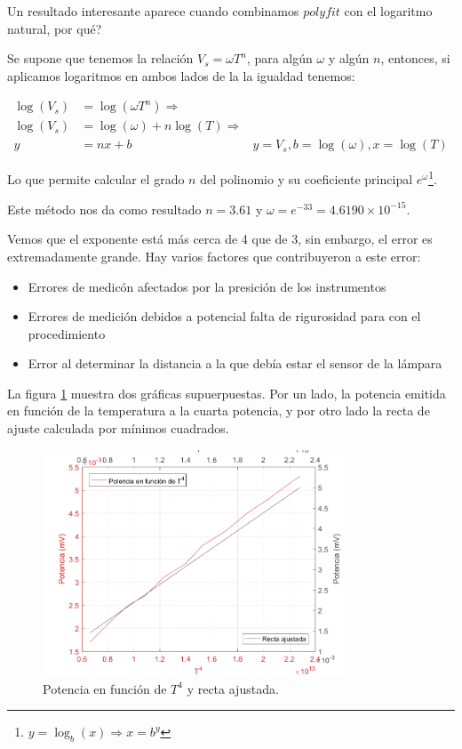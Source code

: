 \documentclass[a4paper]{article}
\begin{document}
Un resultado interesante aparece cuando combinamos $polyfit$ con el logaritmo natural, por qué?

Se supone que tenemos la relación $V_s = \omega T^n$, para algún $\omega$ y algún $n$, entonces, si aplicamos logaritmos en ambos lados de la la igualdad tenemos:

\begin{align*}
    \log(V_s) &= \log(\omega T^n) \Rightarrow\\
    \log(V_s) &= \log(\omega) + n\log(T) \Rightarrow\\
    y &= nx + b & y = V_s, b = \log(\omega), x = \log(T)
\end{align*}

Lo que permite calcular el grado $n$ del polinomio y su coeficiente principal $e^\omega$\footnote{$y = \log_b(x) \Rightarrow x = b^y$}.

Este método nos da como resultado $n = 3.61$ y $\omega = e^{-33} = 4.6190 \times 10^{-15}$.

Vemos que el exponente está más cerca de 4 que de 3, sin embargo, el error es extremadamente grande. Hay varios factores que contribuyeron a este error:

\begin{itemize}
    \item Errores de medicón afectados por la presición de los instrumentos
    \item Errores de medición debidos a potencial falta de rigurosidad para con el procedimiento
    \item Error al determinar la distancia a la que debía estar el sensor de la lámpara
\end{itemize}

La figura \ref{fig:sb2} muestra dos gráficas supuerpuestas. Por un lado, la potencia emitida en función de la temperatura a la cuarta potencia, y por otro lado la recta de ajuste calculada por mínimos cuadrados.

\begin{figure}[h!]
\centering
\includegraphics[width=0.8\textwidth]{assets/Stefan_Boltzmann2.png}
\caption{\label{fig:sb2}Potencia en función de $T^4$ y recta ajustada.}
\end{figure}
\end{document}

